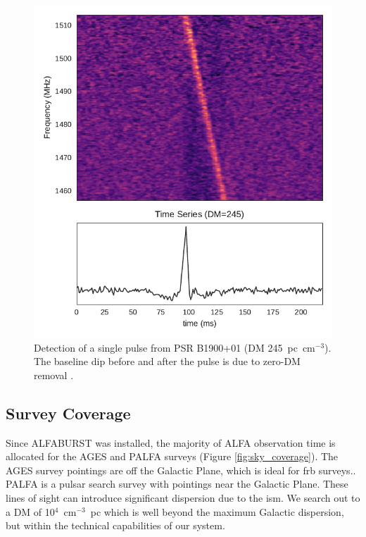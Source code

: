 \documentclass[a4paper,fleqn,usenatbib]{mnras}
\begin{document}
\begin{figure}
    \includegraphics[width=1.0\linewidth]{figures/B1900_01.pdf}
    \caption{Detection of a single pulse from PSR B1900+01 (DM 245~pc~cm$^{-3}$). The
    baseline dip before and after the pulse is due to zero-DM removal
    \citep{2009MNRAS.395..410E}. }
    \label{fig:B1900}
\end{figure}



\subsection{Survey Coverage}
\label{sec:survey_coverage}

Since ALFABURST was installed, the majority of ALFA observation time is
allocated for the AGES \citep{2006MNRAS.371.1617A} and PALFA
\citep{2006ApJ...637..446C} surveys (Figure \ref{fig:sky_coverage}).  The AGES
survey pointings are off the Galactic Plane, which is ideal for \gls{frb}
surveys.. PALFA is a pulsar search survey with pointings near the Galactic
Plane. These lines of sight can introduce significant dispersion due to the
\gls{ism}. We search out to a DM of 10$^{4}$~cm$^{-3}$~pc which is well beyond
the maximum Galactic dispersion, but within the technical capabilities of our
system. 
\end{document}
